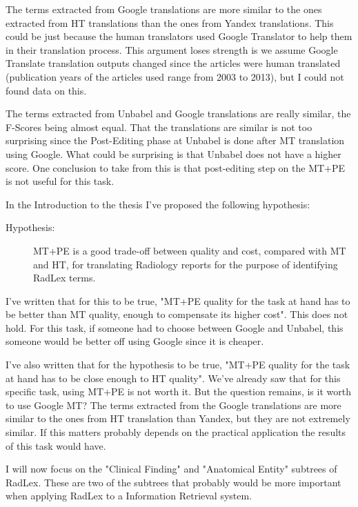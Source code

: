 The terms extracted from Google translations are more similar to the ones extracted from HT translations than the ones from Yandex translations. This could be just because the human translators used Google Translator to help them in their translation process. This argument loses strength is we assume Google Translate translation outputs changed since the articles were human translated (publication years of the articles used range from 2003 to 2013), but I could not found  data on this. 

The terms extracted from Unbabel and Google translations are really similar, the F-Scores being almost equal. That the translations are similar is not too surprising since the Post-Editing phase at Unbabel is done after MT translation using Google. What could be surprising is that Unbabel does not have a higher score. One conclusion to take from this is that post-editing step on the MT+PE is not useful for this task. 

In the Introduction to the thesis I've proposed the following hypothesis:

\begin{description}
	\item[Hypothesis:] MT+PE is a good trade-off between quality and cost, compared with MT and HT, for translating Radiology reports for the purpose of identifying RadLex terms. 
\end{description}

I've written that for this to be true, "MT+PE quality for the task at hand has to be better than MT quality, enough to compensate its higher cost". This does not hold. For this task, if someone had to choose between Google and Unbabel, this someone would be better off using Google since it is cheaper. 

I've also written that for the hypothesis to be true, "MT+PE quality for the task at hand has to be close enough to HT quality". We've already saw that for this specific task, using MT+PE is not worth it. But the question remains, is it worth to use Google MT? The terms extracted from the Google translations are more similar to the ones from HT translation than Yandex, but they are not extremely similar. If this matters probably depends on the practical application the results of this task would have. 

I will now focus on the "Clinical Finding" and "Anatomical Entity" subtrees of RadLex. These are two of the subtrees that probably would be more important when applying RadLex to a Information Retrieval system. 

